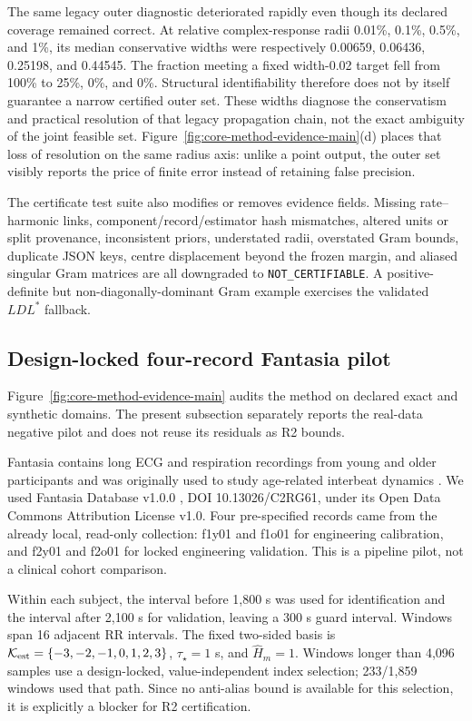 \documentclass[11pt]{article}
\theoremstyle{definition}
\theoremstyle{remark}
\newcommand{\Kest}{\mathcal K_{\rm est}}
\newcommand{\status}[1]{\texttt{#1}}
\begin{document}
The same legacy outer diagnostic deteriorated rapidly even though its declared
coverage remained correct.  At relative complex-response radii 0.01\%, 0.1\%,
0.5\%, and 1\%, its median conservative widths were respectively
0.00659, 0.06436, 0.25198, and
0.44545.  The fraction meeting a fixed width-0.02 target fell from
100\% to 25\%, 0\%, and 0\%.  Structural identifiability therefore does not
by itself guarantee a narrow certified outer set.  These widths diagnose the
conservatism and practical resolution of that legacy propagation chain, not
the exact ambiguity of the joint feasible set.
Figure~\ref{fig:core-method-evidence-main}(d) places that loss of resolution on
the same radius axis: unlike a point output, the outer set visibly reports the
price of finite error instead of retaining false precision.

The certificate test suite also modifies or removes evidence fields.  Missing
rate--harmonic links, component/record/estimator hash mismatches, altered
units or split provenance, inconsistent priors, understated radii, overstated
Gram bounds, duplicate JSON keys, centre displacement beyond the frozen
margin, and aliased singular Gram matrices are all downgraded to
\status{NOT\_CERTIFIABLE}.  A positive-definite but non-diagonally-dominant
Gram example exercises the validated $LDL^*$ fallback.

\subsection{Design-locked four-record Fantasia pilot}

Figure~\ref{fig:core-method-evidence-main} audits the method on declared exact
and synthetic domains.  The present subsection separately reports the
real-data negative pilot and does not reuse its residuals as R2 bounds.

Fantasia contains long ECG and respiration recordings from young and older
participants and was originally used to study age-related interbeat dynamics
\cite{iyengar1996}.  We used Fantasia Database v1.0.0
\cite{fantasia2003,goldberger2000}, DOI 10.13026/C2RG61, under its Open Data
Commons Attribution License v1.0.  Four pre-specified records came from the
already local, read-only collection: f1y01 and f1o01 for engineering
calibration, and f2y01 and f2o01 for locked engineering validation.  This is a
pipeline pilot, not a clinical cohort comparison.

Within each subject, the interval before 1,800 s was used for identification
and the interval after 2,100 s for validation, leaving a 300 s guard interval.
Windows span 16 adjacent RR intervals.  The fixed two-sided basis is
$\Kest=\{-3,-2,-1,0,1,2,3\}$, $\tau_\star=1$ s, and
$\widehat H_m=1$.  Windows longer than 4,096 samples use a design-locked,
value-independent index selection; 233/1,859 windows used that path.  Since no
anti-alias bound is available for this selection, it is explicitly a blocker
for R2 certification.
\end{document}
